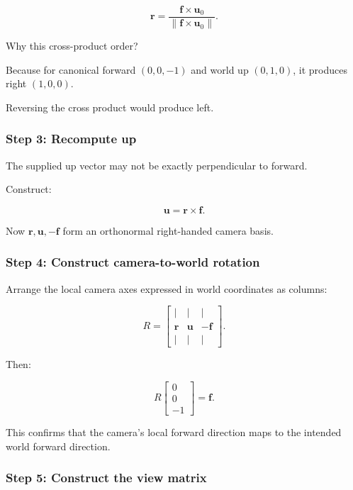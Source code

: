 \[
 \boxed{ \mathbf r= \frac{\mathbf f\times\mathbf u_0} {\|\mathbf f\times\mathbf u_0\|} }.
\]

Why this cross-product order?

Because for canonical forward \((0,0,-1)\) and world up \((0,1,0)\), it produces right \((1,0,0)\).

Reversing the cross product would produce left.

\subsubsection{Step 3: Recompute up}\label{02-foundations-ii-ch032-step-3-recompute-up}

The supplied up vector may not be exactly perpendicular to forward.

Construct:

\[
 \boxed{ \mathbf u=\mathbf r\times\mathbf f }.
\]

Now \(\mathbf r,\mathbf u,-\mathbf f\) form an orthonormal right-handed camera basis.

\subsubsection{Step 4: Construct camera-to-world rotation}\label{02-foundations-ii-ch032-step-4-construct-camera-to-world-rotation}

Arrange the local camera axes expressed in world coordinates as columns:

\[
 \boxed{ R= \begin{bmatrix} |&|&|\\ \mathbf r&\mathbf u&-\mathbf f\\ |&|&| \end{bmatrix} }.
\]

Then:

\[
 R \begin{bmatrix}0\\0\\-1\end{bmatrix} = \mathbf f.
\]

This confirms that the camera's local forward direction maps to the intended world forward direction.

\subsubsection{Step 5: Construct the view matrix}\label{02-foundations-ii-ch032-step-5-construct-the-view-matrix}

